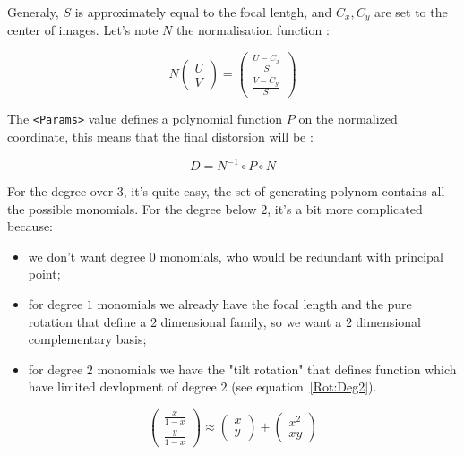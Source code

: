 Generaly, $S$ is approximately equal to the focal lentgh, and $C_x,C_y$ are
set to the center of images. Let's note $N$ the normalisation function :

\begin{equation}
   N \begin{pmatrix} U \\ V \end{pmatrix}
   = \begin{pmatrix} \frac{U-C_x}{S} \\  \frac{V-C_y}{S} \end{pmatrix}
\end{equation}


The {\tt <Params>} value defines a polynomial function $P$ on the normalized
coordinate, this means that the final distorsion will be :


\begin{equation}
    D = N^{-1} \circ P \circ N
\end{equation}

For the degree over $3$, it's quite easy, the set of generating polynom contains
all the possible monomials. For the degree below $2$, it's a bit more complicated
because:

\begin{itemize}
    \item  we don't want degree $0$ monomials, who would be redundant with principal point;
    \item  for degree $1$ monomials we already have the focal length and the pure rotation
           that define a 2 dimensional family, so we want a $2$ dimensional complementary
           basis;
    \item  for degree $2$ monomials we have the "tilt rotation" that defines function which
           have limited devlopment of degree $2$ (see equation~\ref{Rot:Deg2}).
\end{itemize}


\begin{equation}
   \begin{pmatrix}  \frac{x}{1-x} \\  \frac{y}{1-x}  \end{pmatrix}
  \approx \begin{pmatrix}   x  \\  y  \end{pmatrix}
          + \begin{pmatrix}   x^2  \\  xy  \end{pmatrix}
   \label{Rot:Deg2}
\end{equation}

